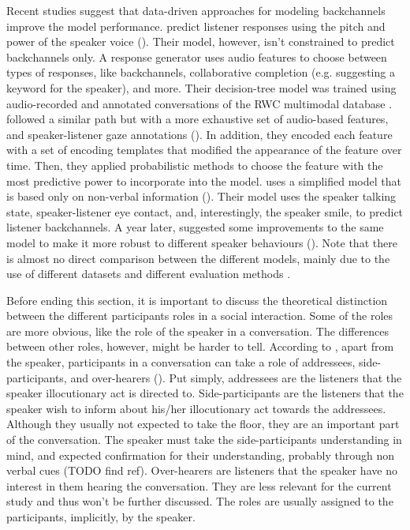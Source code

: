 \documentclass[]{simple-thesis}
\begin{document}
Recent studies suggest that data-driven approaches for modeling backchannels improve the model performance.
\citeauthor{Nishimura2007} predict listener responses using the pitch and power of the speaker voice (\citeyear{Nishimura2007}).
Their model, however, isn't constrained to predict backchannels only.
A response generator uses audio features to choose between types of responses, like backchannels, collaborative completion (e.g. suggesting a keyword for the speaker), and more.
Their decision-tree model was trained using audio-recorded and annotated conversations of the RWC multimodal database \citep{Hayamizu1996}.
\citeauthor{Morency2008} followed a similar path but with a more exhaustive set of audio-based features, and speaker-listener gaze annotations (\citeyear{Morency2008}).
In addition, they encoded each feature with a set of encoding templates that modified the appearance of the feature over time.
Then, they applied probabilistic methods to choose the feature with the most predictive power to incorporate into the model.
\citeauthor{Huang2011} uses a simplified model that is based only on non-verbal information (\citeyear{Huang2011}).
Their model uses the speaker talking state, speaker-listener eye contact, and, interestingly, the speaker smile, to predict listener backchannels.
A year later, \citeauthor{Kok2012} suggested some improvements to the same model to make it more robust to different speaker behaviours (\citeyear{Kok2012}).
Note that there is almost no direct comparison between the different models, mainly due to the use of different datasets and different evaluation methods \citep{Morency2008}.


Before ending this section, it is important to discuss the theoretical distinction between the different participants roles in a social interaction.
Some of the roles are more obvious, like the role of the speaker in a conversation.
The differences between other roles, however, might be harder to tell.
According to \citeauthor{Clark1982}, apart from the speaker, participants in a conversation can take a role of addressees, side-participants, and over-hearers (\citeyear{Clark1982}).
Put simply, addressees are the listeners that the speaker illocutionary act is directed to.
Side-participants are the listeners that the speaker wish to inform about his/her illocutionary act towards the addressees.
Although they usually not expected to take the floor, they are an important part of the conversation.
The speaker must take the side-participants understanding in mind, and expected confirmation for their understanding, probably through non verbal cues (TODO find ref).
Over-hearers are listeners that the speaker have no interest in them hearing the conversation.
They are less relevant for the current study and thus won't be further discussed.
The roles are usually assigned to the participants, implicitly, by the speaker.
\end{document}
